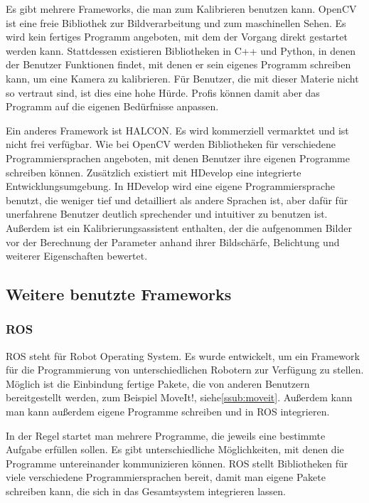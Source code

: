 Es gibt mehrere Frameworks, die man zum Kalibrieren benutzen kann. OpenCV ist eine freie Bibliothek zur Bildverarbeitung und zum maschinellen Sehen. Es wird kein fertiges Programm angeboten, mit dem der Vorgang direkt gestartet werden kann. Stattdessen existieren Bibliotheken in C++ und Python, in denen der Benutzer Funktionen findet, mit denen er sein eigenes Programm schreiben kann, um eine Kamera zu kalibrieren. Für Benutzer, die mit dieser Materie nicht so vertraut sind, ist dies eine hohe Hürde. Profis können damit aber das Programm auf die eigenen Bedürfnisse anpassen.

Ein anderes Framework ist HALCON. Es wird kommerziell vermarktet und ist nicht frei verfügbar. Wie bei OpenCV werden Bibliotheken für verschiedene Programmiersprachen angeboten, mit denen Benutzer ihre eigenen Programme schreiben können. Zusätzlich existiert mit HDevelop eine integrierte Entwicklungsumgebung. In HDevelop wird eine eigene Programmiersprache benutzt, die weniger tief und detailliert als andere Sprachen ist, aber dafür für unerfahrene Benutzer deutlich sprechender und intuitiver zu benutzen ist. Außerdem ist ein Kalibrierungsassistent enthalten, der die aufgenommen Bilder vor der Berechnung der Parameter anhand ihrer Bildschärfe, Belichtung und weiterer Eigenschaften bewertet.

\subsection{Weitere benutzte Frameworks} %
\label{sub:weitere_benutzte_frameworks}
\subsubsection{ROS} %
\label{ssub:ros}
ROS \cite{ROS} steht für Robot Operating System. Es wurde entwickelt, um ein Framework für die Programmierung von unterschiedlichen Robotern zur Verfügung zu stellen. Möglich ist die Einbindung fertige Pakete, die von anderen Benutzern bereitgestellt werden, zum Beispiel MoveIt!, siehe\autoref{ssub:moveit}. Außerdem kann man kann außerdem eigene Programme schreiben und in ROS integrieren.

In der Regel startet man mehrere Programme, die jeweils eine bestimmte Aufgabe erfüllen sollen. Es gibt unterschiedliche Möglichkeiten, mit denen die Programme untereinander kommunizieren können. ROS stellt Bibliotheken für viele verschiedene Programmiersprachen bereit, damit man eigene Pakete schreiben kann, die sich in das Gesamtsystem integrieren lassen.

